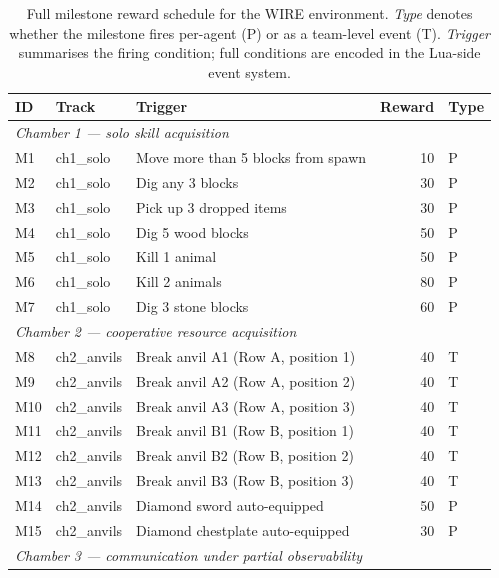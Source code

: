 \documentclass{article}
\theoremstyle{plain}
\theoremstyle{definition}
\theoremstyle{remark}
\begin{document}
\begin{table}[t]
\centering
\caption{Full milestone reward schedule for the WIRE environment. \emph{Type} denotes whether the milestone fires per-agent (P) or as a team-level event (T). \emph{Trigger} summarises the firing condition; full conditions are encoded in the Lua-side event system.}
\label{tab:milestone_schedule}
\small
\begin{tabular}{lllrl}
\toprule
ID & Track & Trigger & Reward & Type \\
\midrule
\multicolumn{5}{l}{\emph{Chamber 1 --- solo skill acquisition}} \\
M1  & ch1\_solo     & Move more than 5 blocks from spawn      & 10   & P \\
M2  & ch1\_solo     & Dig any 3 blocks                        & 30   & P \\
M3  & ch1\_solo     & Pick up 3 dropped items                 & 30   & P \\
M4  & ch1\_solo     & Dig 5 wood blocks                       & 50   & P \\
M5  & ch1\_solo     & Kill 1 animal                           & 50   & P \\
M6  & ch1\_solo     & Kill 2 animals                          & 80   & P \\
M7  & ch1\_solo     & Dig 3 stone blocks                      & 60   & P \\
\midrule
\multicolumn{5}{l}{\emph{Chamber 2 --- cooperative resource acquisition}} \\
M8  & ch2\_anvils   & Break anvil A1 (Row A, position 1)       & 40   & T \\
M9  & ch2\_anvils   & Break anvil A2 (Row A, position 2)       & 40   & T \\
M10 & ch2\_anvils   & Break anvil A3 (Row A, position 3)       & 40   & T \\
M11 & ch2\_anvils   & Break anvil B1 (Row B, position 1)       & 40   & T \\
M12 & ch2\_anvils   & Break anvil B2 (Row B, position 2)       & 40   & T \\
M13 & ch2\_anvils   & Break anvil B3 (Row B, position 3)       & 40   & T \\
M14 & ch2\_anvils   & Diamond sword auto-equipped              & 50   & P \\
M15 & ch2\_anvils   & Diamond chestplate auto-equipped         & 30   & P \\
\midrule
\multicolumn{5}{l}{\emph{Chamber 3 --- communication under partial observability}} \\

\end{tabular}
\end{table}
\end{document}
